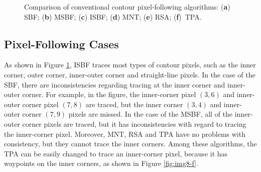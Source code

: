 \documentclass[sensors,article,accept,moreauthors,pdftex,10pt,a4paper]{mdpi}
\begin{document}
\begin{figure}[H]
	 
	\caption{Comparison of conventional contour pixel-following algorithms: (\textbf{a}) SBF; (\textbf{b}) MSBF; (\textbf{c}) ISBF; (\textbf{d}) MNT; (\textbf{e}) RSA; (\textbf{f})~TPA.}
	\label{fig:image8}
\end{figure}

\subsection{Pixel-Following Cases}


As shown in Figure \ref{fig:image8}, ISBF traces most types of contour pixels, such as the inner corner, outer corner, inner-outer corner and straight-line pixels. In the case of the SBF, there are inconsistencies regarding tracing at the inner corner and inner-outer corner. For example, in the figure, the inner-corner pixel $(3, 6)$ and inner-outer corner pixel $(7, 8)$ are traced, but the inner corner $(3, 4)$ and inner-outer corner $(7, 9)$ pixels are missed. In the case of the MSBF, all of the inner-outer corner pixels are traced, but it has inconsistencies with regard to tracing the inner-corner pixel. Moreover, MNT, RSA and TPA have no problems with consistency, but they cannot trace the inner corners. Among these algorithms, the TPA can be easily changed to trace an inner-corner pixel, because it has waypoints on the inner corners, as shown in Figure \ref{fig:img8-f}.
\end{document}
